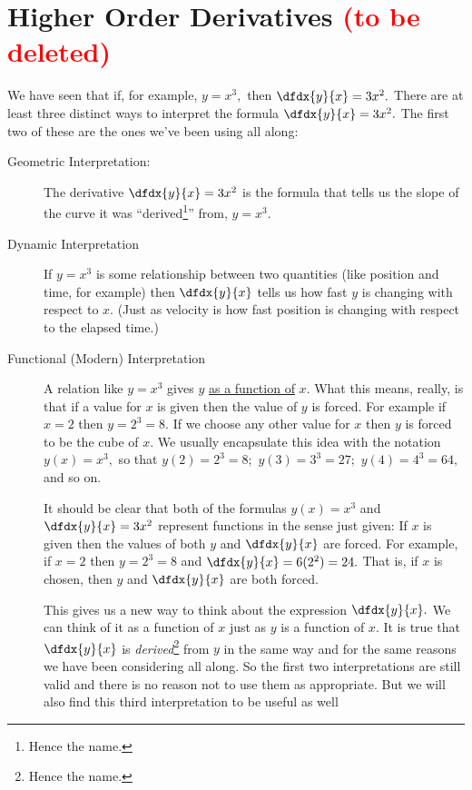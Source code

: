 \section{Higher Order Derivatives \textcolor{red}{(to be deleted)}}
\label{sec:high-order-deriv}

We have seen that if, for example, $y=x^3,$ then $\dfdx{y}{x} = 3x^2.$
There are at least three distinct  ways to interpret the formula $\dfdx{y}{x} =
3x^2.$
The first two of these are the ones we've been using all along:
\begin{description}
\item[Geometric Interpretation:] The derivative $\dfdx{y}{x} = 3x^2$ is the formula
  that tells us the slope of the curve it was ``derived\footnote{Hence the
  name.}'' from, $y=x^3.$
\item[Dynamic Interpretation] If $y=x^3$ is some 
  relationship between two quantities (like position and time, for
  example) then $\dfdx{y}{x}$ tells us how fast $y$ is changing
  with respect to $x.$ (Just as velocity is how fast position is changing
  with respect to the elapsed time.)
\item[Functional (Modern) Interpretation] A relation like $y=x^3$ gives $y$
  \underline{as a function of} $x.$ What this means, really, is that if
  a value for $x$ is given then the value of $y$ is forced. For
  example if $x=2$ then $y=2^3 = 8.$ If we choose any other value for
  $x$ then $y$ is forced to be the cube of $x.$ We usually encapsulate
  this idea with the notation $y(x) = x^3,$ so that $y(2)=2^3=8;$
  $y(3)=3^3=27;$ $y(4)=4^3=64,$ and so on.

 It should be clear
  that both of the formulas $y(x) = x^3$ and $\dfdx{y}{x} = 3x^2$
  represent functions in the sense just given: If $x$
  is given then the values of both $y$ and $\dfdx{y}{x}$ are
  forced. For example, if $x=2$ then $y=2^3=8$ and
  $\dfdx{y}{x}= 6(2^2) = 24.$ That is, if $x$ is chosen, then $y$ and
  $\dfdx{y}{x}$ are both forced. 

  This gives us a new way to think about the expression $\dfdx{y}{x}.$
  We can think of it as a function of $x$ just as $y$ is a function of
  $x.$ It is true that $\dfdx{y}{x}$ is \emph{derived}\footnote{Hence
      the name.} from $y$ in the same way and for the same reasons we
  have been considering all along. So the first two interpretations
  are still valid and there is no reason not to use them as
  appropriate. But we will also find this third interpretation to be
  useful as well
\end{description}

